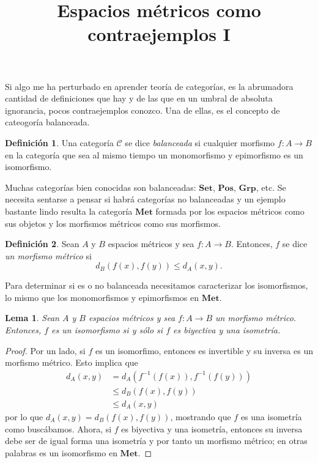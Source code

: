 \documentclass[draft,letter,10pt,notitlepage]{amsart}
\title{Espacios métricos como contraejemplos I}
\date{}
\newtheorem{lemma}{Lema}
\theoremstyle{definition}
\newtheorem*{definition}{Definición}
\theoremstyle{remark}
\begin{document}
\maketitle

Si algo me ha perturbado en aprender teoría de categorías, es 
la abrumadora cantidad de definiciones que hay y de las que
en un umbral de absoluta ignorancia, pocos contraejemplos
conozco. Una de ellas, es el concepto de cateogoría balanceada.

\begin{definition}
  Una categoría \( \mathcal{C}\) se dice \emph{balanceada}
  si cualquier morfismo \( f \colon A \to B\) en la categoría
  que sea al mismo tiempo un monomorfismo y epimorfismo
  es un isomorfismo.
\end{definition}

Muchas categorías bien conocidas son balanceadas: \( \mathbf{Set}\),
\( \mathbf{Pos}\), \( \mathbf{Grp}\), etc. Se necesita sentarse
a pensar si habrá categorías no balanceadas y un ejemplo bastante
lindo resulta la categoría \( \mathbf{Met}\) formada por
los espacios métricos como sus objetos y los morfismos métricos
como sus morfismos.

\begin{definition}
  Sean \( A\) y \( B\) espacios métricos y sea
  \( f \colon A \to B\). Entonces, \( f\) se dice \emph{un
  morfismo métrico} si 
  \[ d_B(f(x),f(y)) \leq d_A(x,y).\]
\end{definition}

Para determinar si es o no balanceada necesitamos caracterizar
los isomorfismos, lo mismo que los monomorfismos y epimorfismos en 
\( \mathbf{Met}\). 

\begin{lemma}
  Sean \( A\) y \( B\) espacios métricos y sea \( f \colon A \to B\)
  un morfismo métrico. Entonces, \( f\) es un isomorfismo
  si y sólo si  \( f\) es biyectiva y una isometría.
\end{lemma}
\begin{proof}
  Por un lado, si \( f\) es un isomorfimo, entonces es invertible y 
  su inversa es un morfismo métrico. Esto implica que
  \begin{align*}
    d_A(x,y) &= d_A\left( f^{-1}(f(x)), f^{-1}(f(y)) \right) \\
    	&\leq d_B(f(x),f(y)) \\
	& \leq d_A(x,y)
  \end{align*}
  por lo que \( d_A(x,y) = d_B(f(x),f(y))\), mostrando que \( f\)
  es una isometría como buscábamos. Ahora, si \( f\) es biyectiva y 
  una isometría, entonces su inversa debe ser de igual forma una
  isometría y por tanto un morfismo métrico; en otras palabras
  es un isomorfismo en \( \mathbf{Met}\).
\end{proof}
\end{document}
